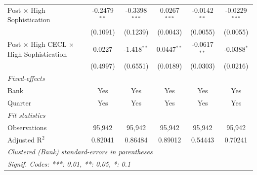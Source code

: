 \begin{tabular}{lccccc}
   Post $\times$ High Sophistication                      & -0.2479$^{**}$                & -0.3398$^{***}$             & 0.0267$^{***}$        & -0.0142$^{**}$ & -0.0229$^{***}$\\   
                                                          & (0.1091)                      & (0.1239)                    & (0.0043)              & (0.0055)       & (0.0055)\\   
   Post $\times$ High CECL $\times$ High Sophistication   & 0.0227                        & -1.418$^{**}$               & 0.0447$^{**}$         & -0.0617$^{**}$ & -0.0388$^{*}$\\   
                                                          & (0.4997)                      & (0.6551)                    & (0.0189)              & (0.0303)       & (0.0216)\\   
   \midrule
   \emph{Fixed-effects}\\
   Bank                                                   & Yes                           & Yes                         & Yes                   & Yes            & Yes\\  
   Quarter                                                & Yes                           & Yes                         & Yes                   & Yes            & Yes\\  
   \midrule
   \emph{Fit statistics}\\
   Observations                                           & 95,942                        & 95,942                      & 95,942                & 95,942         & 95,942\\  
   Adjusted R$^2$                                         & 0.82041                       & 0.86484                     & 0.89012               & 0.54443        & 0.70241\\  
   \midrule \midrule
   \multicolumn{6}{l}{\emph{Clustered (Bank) standard-errors in parentheses}}\\
   \multicolumn{6}{l}{\emph{Signif. Codes: ***: 0.01, **: 0.05, *: 0.1}}\\
\end{tabular}
\par\endgroup


